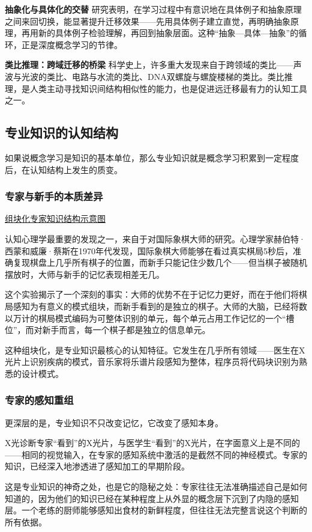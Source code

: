 \documentclass[11pt]{article}
\begin{document}
\textbf{抽象化与具体化的交替} 研究表明，在学习过程中有意识地在具体例子和抽象原理之间来回切换，能显著提升迁移效果——先用具体例子建立直觉，再明确抽象原理，再用新的具体例子检验理解，再回到抽象层面。这种“抽象—具体—抽象”的循环，正是深度概念学习的节律。

\textbf{类比推理：跨域迁移的桥梁} 科学史上，许多重大发现来自于跨领域的类比——声波与光波的类比、电路与水流的类比、DNA双螺旋与螺旋楼梯的类比。类比推理，是人类主动寻找知识间结构相似性的能力，也是促进远迁移最有力的认知工具之一。
\subsection{专业知识的认知结构}
\label{sec:orgf6a8785}

如果说概念学习是知识的基本单位，那么专业知识就是概念学习积累到一定程度后，在认知结构上发生的质变。
\subsubsection{专家与新手的本质差异}
\label{sec:orgf7a4062}

\href{file:///c:/Users/fupen/org/book/插图/组块化专家知识结构示意图.png}{组块化专家知识结构示意图}

认知心理学最重要的发现之一，来自于对国际象棋大师的研究。心理学家赫伯特·西蒙和威廉·蔡斯在1970年代发现，国际象棋大师能够在看过真实棋局5秒后，准确复现棋盘上几乎所有棋子的位置，而新手只能记住少数几个——但当棋子被随机摆放时，大师与新手的记忆表现相差无几。

这个实验揭示了一个深刻的事实：大师的优势不在于记忆力更好，而在于他们将棋局感知为有意义的模式组块，而新手看到的是独立的棋子。大师的大脑，已经将数以万计的棋局模式编码为可整体识别的单元，每个单元占用工作记忆的一个“槽位”，而对新手而言，每一个棋子都是独立的信息单元。

这种组块化，是专业知识最核心的认知特征。它发生在几乎所有领域——医生在X光片上识别疾病的模式，音乐家将乐谱片段感知为整体，程序员将代码块识别为熟悉的设计模式。
\subsubsection{专家的感知重组}
\label{sec:orga8c8f6e}

更深层的是，专业知识不只改变记忆，它改变了感知本身。

X光诊断专家“看到”的X光片，与医学生“看到”的X光片，在字面意义上是不同的——相同的视觉输入，在专家的感知系统中激活的是截然不同的神经模式。专家的知识，已经深入地渗透进了感知加工的早期阶段。

这是专业知识的神奇之处，也是它的隐秘之处：专家往往无法准确描述自己是如何知道的，因为他们的知识已经在某种程度上从外显的概念层下沉到了内隐的感知层。一个老练的厨师能够感知出食材的新鲜程度，但往往无法完整言说这个判断的所有依据。
\end{document}
